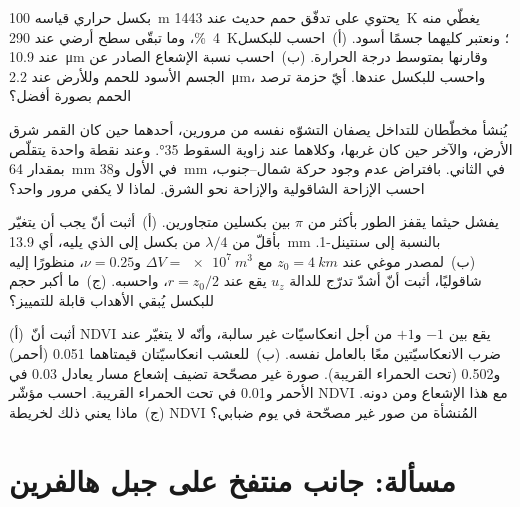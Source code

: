 \begin{exercise}[$\star\star$]\label{exo:b3:remote-sensing-gis:9}
بكسل حراري قياسه \qty{100}{m} يحتوي على تدفّق حمم حديث عند \qty{1443}{K}
يغطّي منه \qty{4}{\percent}، وما تبقّى سطح أرضي عند \qty{290}{K}؛ ونعتبر
كليهما جسمًا أسود. (أ)~احسب  للبكسل
عند \qty{10.9}{\micro\metre} وقارنها بمتوسط درجة الحرارة.
(ب)~احسب نسبة الإشعاع الصادر عن الجسم الأسود للحمم وللأرض
عند \qty{2.2}{\micro\metre}، واحسب  للبكسل
عندها. أيّ حزمة ترصد الحمم بصورة أفضل؟
\end{exercise}

\begin{exercise}[$\star\star\star$]\label{exo:b3:remote-sensing-gis:10}
يُنشأ مخطّطان للتداخل يصفان التشوّه نفسه من مرورين، أحدهما
حين كان القمر شرق الأرض، والآخر حين كان غربها، وكلاهما عند
زاوية السقوط \ang{35}. وعند نقطة واحدة يتقلّص
 بمقدار \qty{64}{mm} في الأول و\qty{38}{mm} في
الثاني. بافتراض عدم وجود حركة شمال--جنوب، احسب الإزاحة الشاقولية
والإزاحة نحو الشرق. لماذا لا يكفي مرور واحد؟
\end{exercise}

\begin{exercise}[$\star\star\star$]\label{exo:b3:remote-sensing-gis:11}
يفشل  حيثما يقفز الطور بأكثر من $\pi$ بين
بكسلين متجاورين. (أ)~أثبت أنّ  يجب أن يتغيّر بأقلّ من $\lambda/4$
من بكسل إلى الذي يليه، أي \qty{13.9}{mm} بالنسبة إلى سنتينل-1.
(ب)~لمصدر موغي عند $z_0 = \qty{4}{km}$ مع $\Delta V =
\qty{e7}{m^3}$ و$\nu = 0.25$، منظورًا إليه شاقوليًا، أثبت أنّ أشدّ
تدرّج للدالة $u_z$ يقع عند $r = z_0/2$، واحسبه. (ج)~ما أكبر
حجم للبكسل يُبقي الأهداب قابلة للتمييز؟
\end{exercise}

\begin{exercise}[$\star\star\star$]\label{exo:b3:remote-sensing-gis:12}
(أ)~أثبت أنّ NDVI يقع بين $-1$ و$+1$ من أجل انعكاسيّات غير سالبة،
وأنّه لا يتغيّر عند ضرب الانعكاسيّتين معًا بالعامل نفسه.
(ب)~للعشب انعكاسيّتان قيمتاهما 0.051 (أحمر)
و0.502 (تحت الحمراء القريبة). صورة غير مصحّحة تضيف إشعاع مسار
يعادل 0.03 في الأحمر و0.01 في تحت الحمراء القريبة. احسب
مؤشّر NDVI مع هذا الإشعاع ومن دونه. (ج)~ماذا يعني ذلك لخريطة
NDVI المُنشأة من صور غير مصحّحة في يوم ضبابي؟
\end{exercise}

\section{مسألة: جانب منتفخ على جبل هالفرين}

